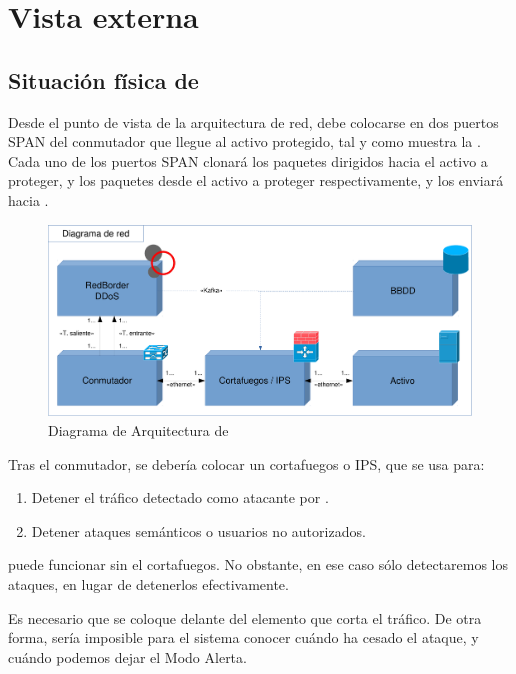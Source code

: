 \section{Vista externa}
\subsection{Situación física de \redborderddos}
Desde el punto de vista de la arquitectura de red, \redborderddos{} debe colocarse en dos puertos SPAN del conmutador que llegue al activo protegido, tal y como muestra la . Cada uno de los 
puertos SPAN clonará los paquetes dirigidos hacia el activo a proteger, y los paquetes desde el activo a proteger 
respectivamente, y los enviará hacia \redborderddos.

\begin{figure}[htbp]
\centering
\includegraphics[width=\textwidth]{CapituloEstructura/Figuras/DiagramaArquitectura-crop}
\caption{Diagrama de Arquitectura de \redborderddos}
\end{figure}
%

Tras el conmutador, se debería colocar un cortafuegos o \gls{IPS}, que se usa para:
\begin{enumerate}
 \item Detener el tráfico detectado como atacante por \redborderddos.
 \item Detener ataques semánticos o usuarios no autorizados.
\end{enumerate}

\redborderddos{} puede funcionar sin el cortafuegos. No obstante, en ese caso sólo detectaremos los 
ataques, en lugar de detenerlos efectivamente.

Es necesario que \redborderddos{} se coloque delante del elemento que corta el tráfico. De otra forma, sería imposible 
para el sistema conocer cuándo ha cesado el ataque, y cuándo podemos dejar el Modo Alerta.

